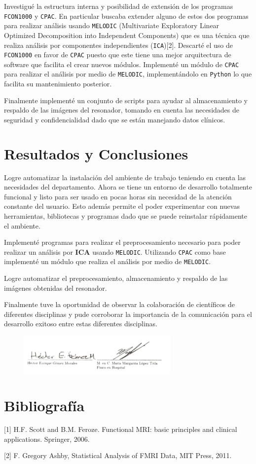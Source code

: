 \documentclass{article}
\begin{document}
Investigué la estructura interna y posibilidad de extensión de los programas \texttt{FCON1000} y \texttt{CPAC}. En particular buscaba extender alguno de estos dos programas para realizar análisis usando \texttt{MELODIC} (Multivariate Exploratory Linear Optimized Decomposition into Independent Components) que es una técnica que realiza análisis por componentes independientes (\texttt{ICA})[2]. Descarté el uso de \texttt{FCON1000} en favor de \texttt{CPAC} puesto que este tiene una mejor arquitectura de software que facilita el crear nuevos módulos. Implementé un módulo de \texttt{CPAC} para realizar el análisis por medio de \texttt{MELODIC}, implementándolo en \texttt{Python} lo que facilita su mantenimiento posterior.

Finalmente implementé un conjunto de scripts para ayudar al almacenamiento y respaldo de las imágenes del resonador, tomando en cuenta las necesidades de seguridad y confidencialidad dado que se están manejando datos clínicos.

\section{Resultados y Conclusiones}

Logre automatizar la instalación del ambiente de trabajo teniendo en cuenta las necesidades del departamento. Ahora se tiene un entorno de desarrollo totalmente funcional y listo para ser usado en pocas horas sin necesidad de la atención constante del usuario. Esto además permite el poder experimentar con nuevas herramientas, bibliotecas y programas dado que se puede reinstalar rápidamente el ambiente.

Implementé programas para realizar el preprocesamiento necesario para poder realizar un análisis por \textbf{ICA} usando \texttt{MELODIC}. Utilizando \texttt{CPAC} como base implementé un módulo que realiza el análisis por medio de \texttt{MELODIC}.

Logre automatizar el preprocesamiento, almacenamiento y respaldo de las imágenes obtenidas del resonador.

Finalmente tuve la oportunidad de observar la colaboración de científicos de diferentes disciplinas y pude corroborar la importancia de la comunicación para el desarrollo exitoso entre estas diferentes disciplinas.

\begin{figure}[h!]
	\centering\includegraphics[width=0.7\textwidth]{signatures.png}
\end{figure}\vskip10pt

\section{Bibliografía}

[1] H.F. Scott and B.M. Feroze. Functional MRI: basic principles and clinical applications. Springer, 2006.

[2] F. Gregory Ashby, Statistical Analysis of FMRI Data, MIT Press, 2011.
\end{document}
